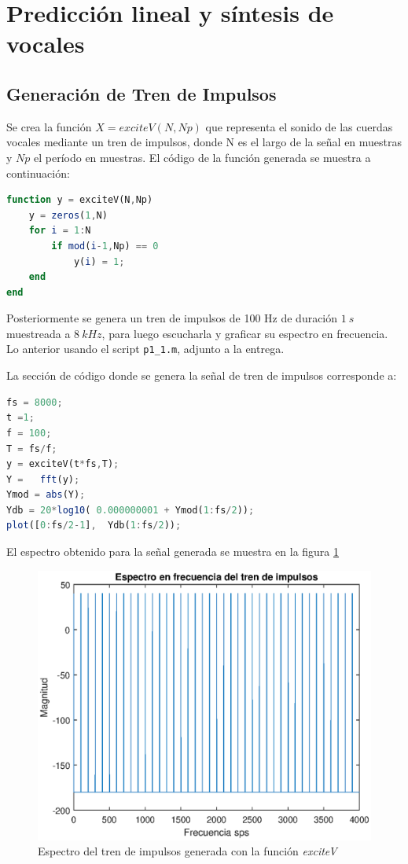 \section{Predicción lineal y síntesis de vocales}

\subsection{Generación de Tren de Impulsos}
Se crea la función $X = exciteV (N, N p)$ que representa el sonido de las cuerdas vocales mediante un tren
de impulsos, donde N es el largo de la señal en muestras y $Np$ el período en muestras. El código de la función generada se muestra a continuación:
\begin{lstlisting}[language = octave]
function y = exciteV(N,Np)
    y = zeros(1,N)
    for i = 1:N
        if mod(i-1,Np) == 0
            y(i) = 1;
    end
end
\end{lstlisting}

Posteriormente se genera un tren de impulsos de 100 Hz de duración $1~s$ muestreada a $8~kHz$, para luego escucharla y graficar su espectro en frecuencia. Lo anterior usando el script \texttt{p1\_1.m}, adjunto a la entrega.

La sección de código donde se genera la señal de tren de impulsos corresponde a:
\begin{lstlisting}[language = octave]
fs = 8000;
t =1;
f = 100;
T = fs/f;
y = exciteV(t*fs,T);
Y =   fft(y);
Ymod = abs(Y);
Ydb = 20*log10( 0.000000001 + Ymod(1:fs/2));  
plot([0:fs/2-1],  Ydb(1:fs/2));

\end{lstlisting}



El espectro obtenido para la señal generada se muestra en  la figura \ref{frec_tren}

\begin{figure}[H]
    \centering
    \includegraphics[scale = 0.7]{figures/p1_1frec_tren.eps}
    \caption{Espectro del tren de impulsos generada con la función \textit{exciteV}}
    \label{frec_tren}
\end{figure}

